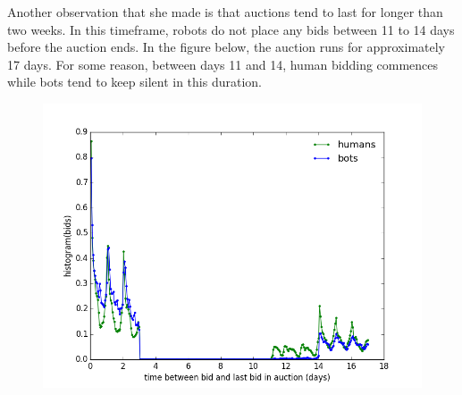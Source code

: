 \documentclass{article} %
\begin{document}
\begin{figure}[h]
\centering
{}
\end{figure}

Another observation that she made is that auctions tend to last for longer than two weeks.
In this timeframe, robots do not place any bids between 11 to 14 days before the auction ends.
In the figure below, the auction runs for approximately 17 days.
For some reason, between days 11 and 14, human bidding commences while bots tend to keep silent in this duration.

\begin{figure}[h]
\centering
{\includegraphics[scale=0.26]{img/yellowduck2.png}}
\end{figure}
\end{document}
